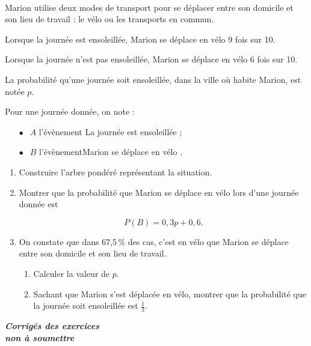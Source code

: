 \documentclass[12pt,fleqn]{report} %
\begin{document}
\begin{exercise}\label{Exercice 60}\text{ }\\
	Marion utilise deux modes de transport pour se déplacer entre son domicile et son lieu de travail : le vélo ou les transports en commun.
	
	Lorsque la journée est ensoleillée, Marion se déplace en vélo 9 fois sur 10.
	
	Lorsque la journée n'est pas ensoleillée, Marion se déplace en vélo 6 fois sur 10.
	
	La probabilité qu'une journée soit ensoleillée, dans la ville où habite Marion, est notée $p$.
	
	Pour une journée donnée, on note :
	
	\setlength\parindent{9mm}
	\begin{itemize}
		\item[$\bullet~~$] $A$ l'évènement \og La journée est ensoleillée \fg{} ;
		\item[$\bullet~~$] $B$ l'évènement\og Marion se déplace en vélo \fg.
	\end{itemize}
	\setlength\parindent{0mm}
	
	\medskip
	
	\begin{enumerate}
		\item Construire l'arbre pondéré représentant la situation.
		\item Montrer que la probabilité que Marion se déplace en vélo lors d'une journée donnée
		est 
		
		\[P(B) = 0,3p + 0,6.\]
		\item On constate que dans 67,5\,\% des cas, c'est en vélo que Marion se déplace entre son
		domicile et son lieu de travail.
		\begin{enumerate}
			\item Calculer la valeur de $p$.
			\item Sachant que Marion s'est déplacée en vélo, montrer que la probabilité que la journée soit ensoleillée est $\frac{1}{3}$.
		\end{enumerate}
	\end{enumerate}
\end{exercise}


\newpage

{
	\thispagestyle{empty}
	\centering
	
	\hspace{0pt}
	\vfill
	
	{\Huge 
		\color{Hred}
		\textbf{\textit{Corrigés des exercices\\
				non à soumettre}}
	}
	
	
	\vfill
	\hspace{0pt}
	
}
\end{document}

